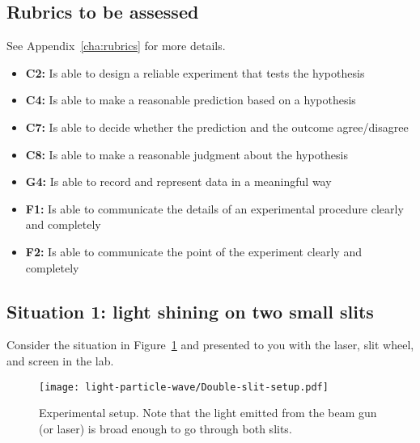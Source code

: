 \subsection{Rubrics to be assessed}

See Appendix~\ref{cha:rubrics} for more details.

\begin{itemize}
	\item \textbf{C2:} Is able to design a reliable experiment that tests the hypothesis
	
	\item \textbf{C4:} Is able to make a reasonable prediction based on a hypothesis
	
	\item \textbf{C7:} Is able to decide whether the prediction and the outcome agree/disagree
	
	\item \textbf{C8:} Is able to make a reasonable judgment about the hypothesis
	
	\item \textbf{G4:} Is able to record and represent data in a meaningful way
	
	\item \textbf{F1:} Is able to communicate the details of an experimental procedure clearly and completely
	
	\item \textbf{F2:} Is able to communicate the point of the experiment clearly and completely
\end{itemize}

\subsection{Situation 1: light shining on two small slits}

Consider the situation in Figure~\ref{lpw:fig:2slit-setup} and presented to you with the laser, slit wheel, and screen in the lab.

\begin{figure}
	\centering
	\texttt{[image: light-particle-wave/Double-slit-setup.pdf]}
	\caption{Experimental setup. Note that the light emitted from the beam gun (or laser) is broad enough to go through both slits.}\label{lpw:fig:2slit-setup}
\end{figure}

